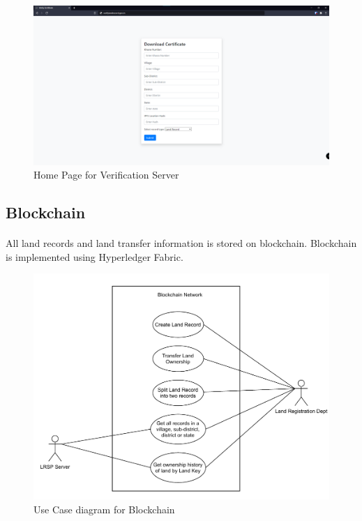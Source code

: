 \documentclass{article}
\begin{document}
        \begin{figure}[H]
                \includegraphics[scale=0.25]{verification_home.png}
                \centering
                \caption{Home Page for Verification Server}
        \end{figure}

    \subsection{Blockchain}
        \paragraph{}
        All land records and land transfer information is stored on blockchain. Blockchain is implemented using Hyperledger Fabric.

        \begin{figure}[htbp]
            \includegraphics[scale=0.25]{blockchain_use_cases}
            \centering
            \caption{Use Case diagram for Blockchain}
            \label{fig:bl_use_case}
        \end{figure}
\end{document}
